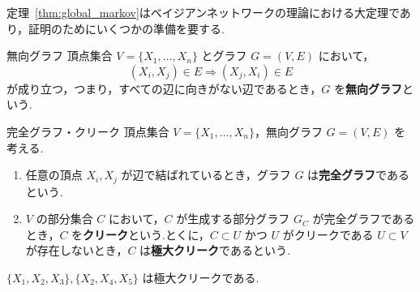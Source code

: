 \documentclass[uplatex, dvipdfmx]{jsarticle}
\begin{document}
定理~\ref{thm:global_markov}はベイジアンネットワークの理論における大定理であり，証明のためにいくつかの準備を要する.

\begin{defn}{無向グラフ}
  頂点集合 $V = \{X_1, \dots, X_n\}$ とグラフ $G = (V, E)$ において，
  \begin{equation}
      (X_i, X_j) \in E \Rightarrow (X_j, X_i) \in E
  \end{equation}
  が成り立つ，つまり，すべての辺に向きがない辺であるとき，$G$ を\textbf{無向グラフ}という.
\end{defn}

\begin{defn}{完全グラフ・クリーク}
  頂点集合 $V = \{X_1, \dots, X_n\}$，無向グラフ $G = (V, E)$ を考える.
  \begin{enumerate}
      \item 任意の頂点 $X_i, X_j$ が辺で結ばれているとき，グラフ $G$ は\textbf{完全グラフ}であるという.
      \item $V$ の部分集合 $C$ において，$C$ が生成する部分グラフ $G_C$ が完全グラフであるとき，$C$ を\textbf{クリーク}という.とくに，$C \subset U$ かつ $U$ がクリークである $U \subset V$ が存在しないとき，$C$ は\textbf{極大クリーク}であるという.
  \end{enumerate}
\end{defn}

\begin{exm}{}
  \begin{center}
  \end{center}

  $\{X_1, X_2, X_3\}, \{X_2, X_4, X_5\}$ は極大クリークである.
\end{exm}
\end{document}

